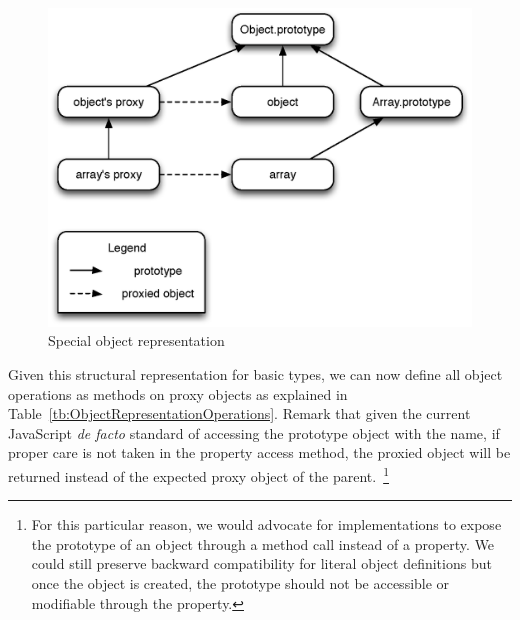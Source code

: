 \begin{figure}[htb]
\begin{center}
\includegraphics[scale=0.75]{figures/specialRepresentation}
\caption{\label{fig:SpecialRepresentation} Special object representation}
\end{center}
\end{figure}

Given this structural representation for basic types, we can now define all
object operations as methods on proxy objects as explained in
Table~\ref{tb:ObjectRepresentationOperations}. Remark that given the current
JavaScript \textit{de facto} standard of accessing the prototype object with
the  name, if proper care is not taken in the property access
method, the proxied object will be returned instead of the expected proxy
object of the parent.~\footnote{For this particular reason, we would advocate
for implementations to expose the prototype of an object through a method call
instead of a property. We could still preserve backward compatibility for
literal object definitions but once the object is created, the prototype
should not be accessible or modifiable through the  property.}

